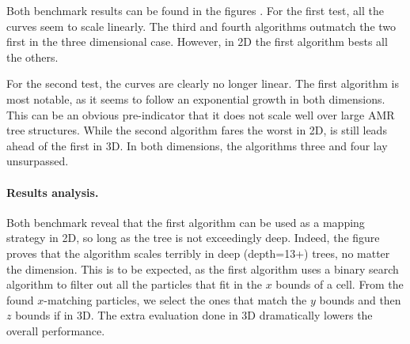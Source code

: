 \documentclass[
	a4paper,
	12pt,
	raggedright,
	twoside
]{tufte-style-article}
\theoremstyle{definition}
\theoremstyle{remark}
\begin{document}
Both benchmark results can be found in the figures . For the first test, all the curves seem to scale linearly. The third and fourth algorithms outmatch the two first in the three dimensional case. However, in 2D the first algorithm bests all the others.

For the second test, the curves are clearly no longer linear. The first algorithm is most notable, as it seems to follow an exponential growth in both dimensions. This can be an obvious pre-indicator that it does not scale well over large \Gls{AMR} tree structures. While the second algorithm fares the worst in 2D, is still leads ahead of the first in 3D. In both dimensions, the algorithms three and four lay unsurpassed.

\begin{figure}[h!]
    \centering
    \subfloat[2D tree, $d=2$.]{
        
        \label{fig:n_2D}
    }

    \subfloat[3D tree, $d=3$.]{
        
        \label{fig:n_3D}
    }
\end{figure}

\begin{figure}[h!]
    \centering
    \subfloat[2D tree, $d=2$.]{
        
        \label{fig:depth_2D}
    }

    \subfloat[3D tree, $d=3$.]{
        
        \label{fig:depth_3D}
    }
\end{figure}

\paragraph{Results analysis.} Both benchmark reveal that the first algorithm can be used as a mapping strategy in 2D, so long as the tree is not exceedingly deep. Indeed, the figure  proves that the algorithm scales terribly in deep (depth=13+) trees, no matter the dimension. This is to be expected, as the first algorithm uses a binary search algorithm to filter out all the particles that fit in the $x$ bounds of a cell. From the found $x$-matching particles, we select the ones that match the $y$ bounds and then $z$ bounds if in 3D. The extra evaluation done in 3D dramatically lowers the overall performance.
\end{document}
